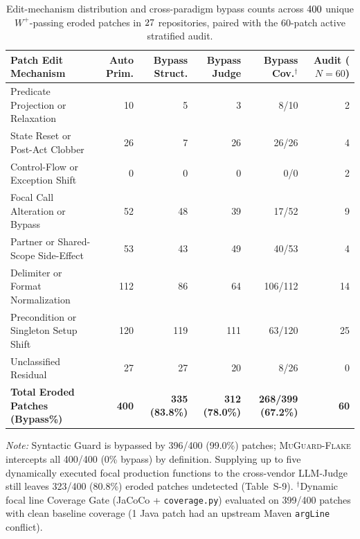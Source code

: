 \begin{table}[t]
\centering
\scriptsize
\setlength{\tabcolsep}{2.7pt}
\caption{Edit-mechanism distribution and cross-paradigm bypass counts across $400$ unique $W^+$-passing eroded patches in $27$ repositories, paired with the 60-patch active stratified audit.}
\label{tab:taxonomy}
\begin{tabular}{lrrrrr}
\toprule
Patch Edit Mechanism & Auto Prim. & Bypass Struct. & Bypass Judge & Bypass Cov.$^{\dagger}$ & Audit ($N=60$) \\
\midrule
Predicate Projection or Relaxation & 10 & 5 & 3 & 8/10 & 2 \\
State Reset or Post-Act Clobber & 26 & 7 & 26 & 26/26 & 4 \\
Control-Flow or Exception Shift & 0 & 0 & 0 & 0/0 & 2 \\
Focal Call Alteration or Bypass & 52 & 48 & 39 & 17/52 & 9 \\
Partner or Shared-Scope Side-Effect & 53 & 43 & 49 & 40/53 & 4 \\
Delimiter or Format Normalization & 112 & 86 & 64 & 106/112 & 14 \\
Precondition or Singleton Setup Shift & 120 & 119 & 111 & 63/120 & 25 \\
Unclassified Residual & 27 & 27 & 20 & 8/26 & 0 \\
\midrule
\textbf{Total Eroded Patches (Bypass\%)} & \textbf{400} & \textbf{335 (83.8\%)} & \textbf{312 (78.0\%)} & \textbf{268/399 (67.2\%)} & \textbf{60} \\
\bottomrule
\end{tabular}
\par\smallskip\parbox{0.97\textwidth}{\scriptsize\textit{Note:} Syntactic Guard is bypassed by 396/400 (99.0\%) patches; \textsc{MuGuard-Flake} intercepts all 400/400 (0\% bypass) by definition. Supplying up to five dynamically executed focal production functions to the cross-vendor LLM-Judge still leaves 323/400 (80.8\%) eroded patches undetected (Table~S-9). $^{\dagger}$Dynamic focal line Coverage Gate (JaCoCo + \texttt{coverage.py}) evaluated on 399/400 patches with clean baseline coverage (1 Java patch had an upstream Maven \texttt{argLine} conflict).}
\end{table}
